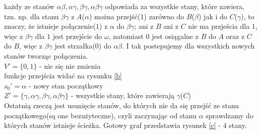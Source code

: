 {	każdy ze stanów $\alpha\beta, \alpha\gamma, \beta\gamma, \alpha\beta\gamma$ odpowiada za wszystkie stany, które zawiera, tzn. np. dla stanu $\beta\gamma$ z $A$($\alpha$) można przejść($1$) zarówno do $B$($\beta$) jak i do $C$($\gamma$), to znaczy, że istnieje połączenie($1$) z $\alpha$ do $\beta\gamma$; ani z $B$ ani z $C$ nie ma przjeścia dla $1$, więc z $\beta\gamma$ dla $1$ jest przejście do $\omega$, natomiast $0$ jest osiągalne z $B$ do $A$ oraz z $C$ do $B$, więc z $\beta\gamma$ jest strzałka($0$) do $\alpha\beta$. I tak postepujemy dla wszystkich nowych stanów tworząc połączenia.\\
	$V' = \{0,1\}$ - nic się nie zmienia\\
	funkcje przejścia widać na rysunku \ref{b}\\
	$s_0' = \alpha$ - nowy stan początkowy\\
	$Z' = \{\gamma, \alpha\gamma, \beta\gamma, \alpha\beta\gamma\}$ - wszystkie stany, które zawierają $\gamma$($C$)\\
	\newline
	Ostatnią rzeczą jest usunięcie stanów, do których nie da się przejść ze stanu początkowego(są one bezużyteczne), czyli zaczynając od stanu $\alpha$ sprawdzamy do których stanów istnieje ścieżka. Gotowy graf przedstawia rysunek \ref{c} - $4$ stany.
	
}
